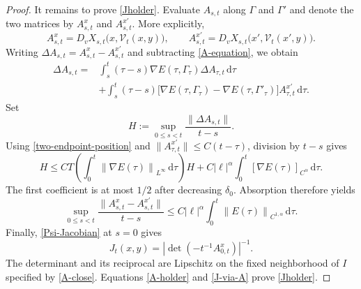 \documentclass[10pt,a4paper]{amsart}
\newcommand{\dd}{\,\mathrm d}
\newcommand{\norm}[1]{\left\lVert #1\right\rVert}
\begin{document}
\begin{proof}
It remains to prove \eqref{Jholder}.  Evaluate $A_{s,t}$ along $\Gamma$ and
$\Gamma'$ and denote the two matrices by $A^x_{s,t}$ and $A^{x'}_{s,t}$.
More explicitly,
\begin{equation*}
 A^x_{s,t}=D_vX_{s,t}\bigl(x,\mathcal V_t(x,y)\bigr),\qquad
 A^{x'}_{s,t}=D_vX_{s,t}\bigl(x',\mathcal V_t(x',y)\bigr).
\end{equation*}
Writing $\Delta A_{s,t}=A^x_{s,t}-A^{x'}_{s,t}$ and subtracting
\eqref{A-equation}, we obtain
\begin{align*}
 \Delta A_{s,t}
 ={}&\int_s^t(\tau-s)\nabla E(\tau,\Gamma_\tau)
                    \Delta A_{\tau,t}\dd\tau\\
 &+\int_s^t(\tau-s)
 \bigl[\nabla E(\tau,\Gamma_\tau)
       -\nabla E(\tau,\Gamma'_\tau)\bigr]
 A^{x'}_{\tau,t}\dd\tau.
\end{align*}
Set
\begin{equation*}
 H:=\sup_{0\leq s<t}\frac{\|\Delta A_{s,t}\|}{t-s}.
\end{equation*}
Using \eqref{two-endpoint-position} and
$\|A^{x'}_{\tau,t}\|\leq C(t-\tau)$, division by $t-s$ gives
 \begin{equation*}
 H\leq CT\!\left(\int_0^t\norm{\nabla E(\tau)}_{L^\infty}\dd\tau\right)H
 +C|\ell|^\alpha\int_0^t
     [\nabla E(\tau)]_{C^\alpha}\dd\tau.
\end{equation*} 
The first coefficient is at most $1/2$ after decreasing $\delta_0$.
Absorption therefore yields
\begin{equation}\label{A-holder}
 \sup_{0\leq s<t}\frac{\|A^x_{s,t}-A^{x'}_{s,t}\|}{t-s}
 \leq C|\ell|^\alpha
       \int_0^t\norm{E(\tau)}_{C^{1,\alpha}}\dd\tau.
\end{equation}
Finally, \eqref{Psi-Jacobian} at $s=0$ gives
\begin{equation}\label{J-via-A}
 J_t(x,y)=
 \left|\det\left(-t^{-1}A^x_{0,t}\right)\right|^{-1}.
\end{equation}
The determinant and its reciprocal are Lipschitz on the fixed neighborhood
of $I$ specified by \eqref{A-close}.  Equations \eqref{A-holder} and
\eqref{J-via-A} prove \eqref{Jholder}.
\end{proof}
\end{document}
